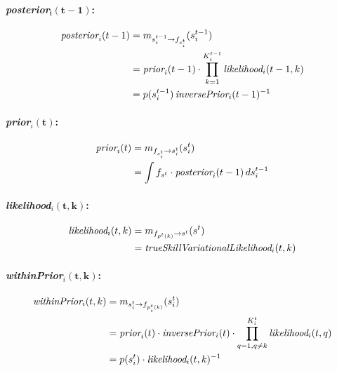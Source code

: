 \documentclass[11pt,twoside,spanish]{report} %
\begin{document}
\paragraph{\emph{posterior}$\bm{_i(t-1)}$:}

\begin{equation}
\begin{split}
\emph{posterior}_i(t-1)&= m_{s_i^{t-1}\rightarrow f_{s_i^t}}(s_i^{t-1}) \\
&= \emph{prior}_i(t-1) \cdot \prod_{k=1}^{K_i^{t-1}} \emph{likelihood}_i(t-1,k)\\
&= p(s_i^{t-1}) \, \emph{inversePrior}_i(t-1)^{-1}
\end{split}
\end{equation}


\paragraph{\emph{prior}$_i\bm{(t)}$:}

\begin{equation}
\begin{split}
\emph{prior}_i(t) &= m_{f_{s_i^t} \rightarrow s_i^t}(s_i^t) \\
&= \int f_{s^t} \cdot \emph{posterior}_i(t-1) \, ds_i^{t-1}
\end{split}
\end{equation}

\paragraph{\emph{likelihood}$_i\bm{(t,k)}$:}

\begin{equation}
\begin{split}
\emph{likelihood}_i(t,k) &= m_{f_{p^{t}(k)} \rightarrow s^t}(s^t) \\
&= \emph{trueSkillVariationalLikelihood}_i(t,k)
\end{split}
\end{equation}

\paragraph{\emph{withinPrior}$_i\bm{(t,k)}$:}


\begin{equation}
\begin{split}
\emph{withinPrior}_i(t,k) &= m_{s_i^t \rightarrow f_{p_i^t(k)}}(s_i^t)  \\
&= \emph{prior}_i(t) \cdot \emph{inversePrior}_i(t) \cdot \prod_{q=1, q\neq k}^{K_i^t} \emph{likelihood}_i(t,q) \\
&= p(s_i^t) \cdot \emph{likelihood}_i(t,k)^{-1}
\end{split}
\end{equation}
\end{document}
